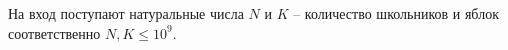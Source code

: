 На вход поступают натуральные числа $N$ и $K$ -- количество школьников и яблок соответственно $N, K \leq 10^9$.